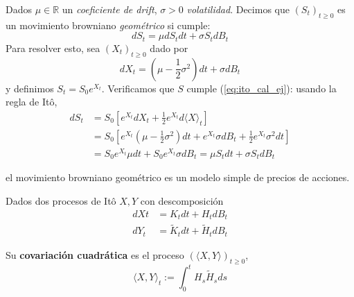 \begin{example}
        Dados $\mu \in \mathbb{R}$ un \textit{coeficiente de drift}, $\sigma > 0$  \textit{volatilidad}. 
        Decimos que $(S_t)_{t \ge 0}$ es un movimiento browniano \textit{geométrico} si 
        cumple: 
        \begin{equation*}
                \label{eq:ito_cal_ej}
                \tag{$\triangle$}
                dS_t = \mu dS_t dt + \sigma S_t dB_t
        \end{equation*}
        Para resolver esto, sea $(X_t)_{t \ge 0}$ dado por 
        \begin{equation*}
                dX_t = (\mu - \frac{1}{2} \sigma^2) dt + \sigma d B_t
        \end{equation*}
        y definimos $S_t = S_0 e^{X_t}$. Verificamos que $S$ cumple (\ref{eq:ito_cal_ej}): 
        usando la regla de It\^{o}, 
        \begin{align*}
                dS_t 
                &= S_0 \left[e^{X_t} dX_t + \frac{1}{2} e^{X_t} d \langle X  \rangle_t \right] \\
                &= S_0 \left[e^{X_t} (\mu - \frac{1}{2} \sigma^2)dt + e^{X_t} \sigma dB_t + \frac{1}{2} 
                    e^{X_t} \sigma^2 dt    \right] \\
                &= S_0 e^{X_t} \mu dt + S_0 e^{X_t} \sigma dB_t = \mu S_t dt + \sigma S_t dB_t
        \end{align*}

        el movimiento browniano geométrico es un modelo simple de precios de acciones.
\end{example}
\begin{definition}
        Dados dos procesos de It\^{o} $X,Y$ con descomposición
        \begin{align*}
                \label{eq:ito_cal_4}
                \tag{$\star\star$}
                dXt &= K_t dt + H_t dB_t \\ 
                dY_t&= \tilde{K} _t dt + \tilde{H}_t dB_t
        \end{align*}

        Su \textbf{covariación cuadrática} es el proceso $(\langle X,Y \rangle)_{t \ge  0}$, 
        \begin{equation*}
                \langle X,Y \rangle_t := \int_{0}^{t} H_s \tilde{H} _s  ds
        \end{equation*}
\end{definition}

